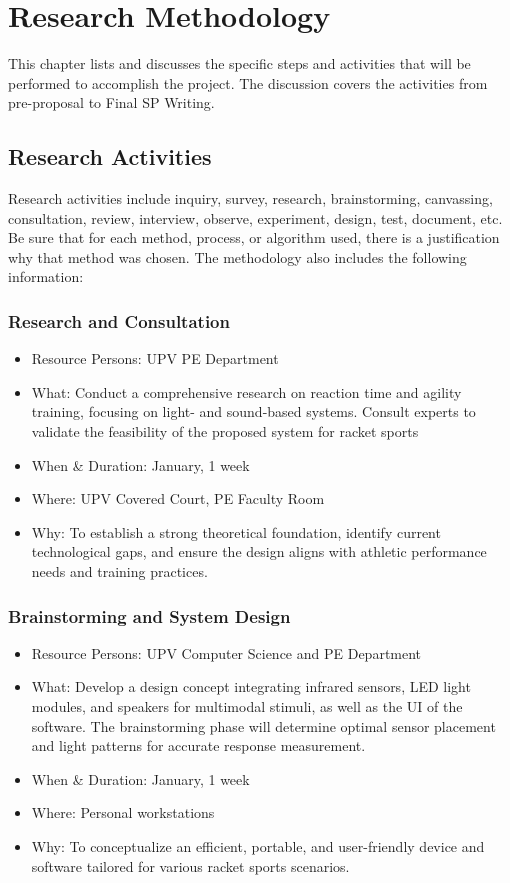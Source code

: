 \chapter{Research Methodology}
This chapter lists and discusses the specific steps and activities that will be performed  to accomplish the project. 
The discussion covers the activities from pre-proposal to Final SP Writing.

\section{Research Activities}
Research activities include inquiry, survey, research, brainstorming, canvassing, consultation, review, interview, observe, experiment, design, test, document, etc.  
Be sure that for each method, process, or algorithm used, there is a justification why that method was chosen.
The methodology also includes the following information:

\subsection{Research and Consultation}
\begin{itemize}
   \item Resource Persons: UPV PE Department
   \item What: Conduct a comprehensive research on reaction time and agility training, focusing on light- and sound-based systems. Consult experts to validate the feasibility of the proposed system for racket sports
   \item When & Duration: January, 1 week
   \item Where: UPV Covered Court, PE Faculty Room
   \item Why: To establish a strong theoretical foundation, identify current technological gaps, and ensure the design aligns with athletic performance needs and training practices.
\end{itemize}

\subsection{Brainstorming and System Design}
\begin{itemize}
	\item Resource Persons: UPV Computer Science and PE Department
	\item What: Develop a design concept integrating infrared sensors, LED light modules, and speakers for multimodal stimuli, as well as the UI of the software. The brainstorming phase will determine optimal sensor placement and light patterns for accurate response measurement.
	\item When & Duration: January, 1 week
	\item Where: Personal workstations
	\item Why: To conceptualize an efficient, portable, and user-friendly device and software tailored for various racket sports scenarios.
\end{itemize}

